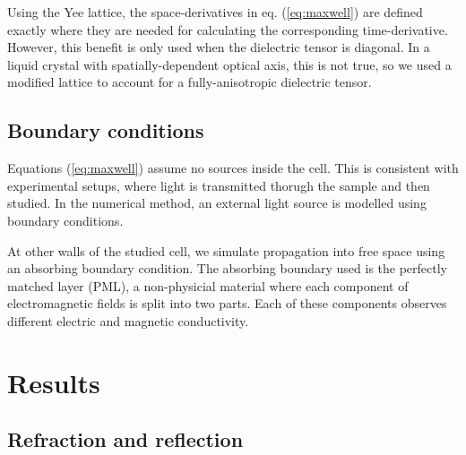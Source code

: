 \documentclass[a4paper,10pt]{article}
\renewenvironment{figure}
  {\par\medskip\noindent\minipage{\linewidth}}
  {\endminipage\par\medskip}
\begin{document}
\begin{multicols}{2}
\begin{figure}
\label{fig:lattice}
\end{figure}

Using the Yee lattice, the space-derivatives in eq. (\ref{eq:maxwell}) are defined exactly where they are needed for calculating the corresponding time-derivative. 
However, this benefit is only used when the dielectric tensor is diagonal. 
In a liquid crystal with spatially-dependent optical axis, this is not true, so we used a modified lattice to account for a fully-anisotropic dielectric tensor. 

\subsection{Boundary conditions}

Equations (\ref{eq:maxwell}) assume no sources inside the cell. 
This is consistent with experimental setups, where light is transmitted thorugh the sample and then studied. 
In the numerical method, an external light source is modelled using boundary conditions. 

At other walls of the studied cell, we simulate propagation into free space using an absorbing boundary condition. 
The absorbing boundary used is the perfectly matched layer (\textsc{PML}), a non-physicial material where each component of electromagnetic fields is split into two parts. 
Each of these components observes different electric and magnetic conductivity. 

\section{Results}

\subsection{Refraction and reflection}


\end{multicols}
\end{document}
